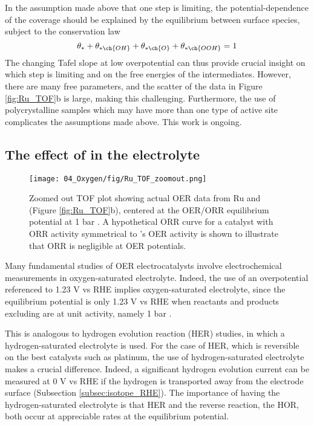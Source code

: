 In the assumption made above that one step is limiting, the potential-dependence of the coverage should be explained by the equilibrium between surface species, subject to the conservation law
\begin{equation}
 \theta_{*} + \theta_{* \ch{OH}} + \theta_{* \ch{O}} + \theta_{* \ch{OOH}} = 1
\end{equation}
The changing Tafel slope at low overpotential can thus provide crucial insight on which step is limiting and on the free energies of the intermediates. However, there are many free parameters, and the scatter of the data in Figure \ref{fig:Ru_TOF}b is large, making this challenging. Furthermore, the use of polycrystalline samples which may have more than one type of active site complicates the assumptions made above. This work is ongoing.


\subsection{The effect of  in the electrolyte}
\begin{figure}[b!]
	\centering
	\texttt{[image: 04\_Oxygen/fig/Ru\_TOF\_zoomout.png]}
	\caption{Zoomed out TOF plot showing actual OER data from Ru and  (Figure \ref{fig:Ru_TOF}b), centered at the OER/ORR equilibrium potential at 1 bar . A hypothetical ORR curve for a catalyst with ORR activity symmetrical to 's OER activity is shown to illustrate that ORR is negligible at OER potentials.}
	\label{fig:Ru_TOF_zoomout}
\end{figure}

Many fundamental studies of OER electrocatalysts involve electrochemical measurements in oxygen-saturated electrolyte. Indeed, the use of an overpotential referenced to 1.23 V vs RHE implies oxygen-saturated electrolyte, since the equilibrium potential is only 1.23 V vs RHE when reactants and products excluding  are at unit activity, namely 1 bar . 



This is analogous to hydrogen evolution reaction (HER) studies, in which a hydrogen-saturated electrolyte is used. For the case of HER, which is reversible on the best catalysts such as platinum, the use of hydrogen-saturated electrolyte makes a crucial difference. Indeed, a significant hydrogen evolution current can be measured at 0 V vs RHE if the hydrogen is transported away from the electrode surface (Subsection \ref{subsec:isotope_RHE}). The importance of having the hydrogen-saturated electrolyte is that HER and the reverse reaction, the HOR, both occur at appreciable rates at the equilibrium potential.

